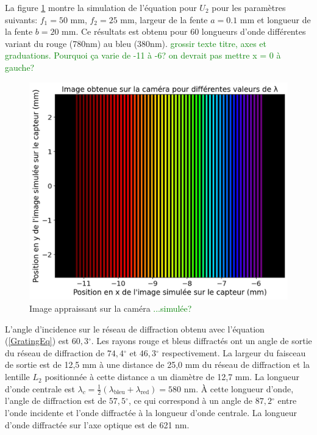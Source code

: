 \documentclass[conference]{IEEEtran}
\begin{document}
 La figure \ref{arc-en-ciel} montre la simulation de l'équation pour $U_2$ pour les paramètres suivants: 
 $f_1=50$ mm, $f_2=25$ mm, largeur de la fente $a=0.1$ mm et longueur de la fente $b=20$ mm. Ce résultats est obtenu pour
 60 longueurs d'onde différentes variant du rouge (780nm) au bleu (380nm). \textcolor{green}{grossir texte titre, axes et graduations. Pourquoi ça varie de -11 à -6? on devrait pas mettre x = 0 à gauche?}
 \begin{figure}[H]
    \centering
    \includegraphics[scale=0.4]{simu2.png}
    \caption{Image appraissant sur la caméra \textcolor{green}{...simulée?}}
    \label{arc-en-ciel}
\end{figure}

L'angle d'incidence sur le réseau de diffraction obtenu avec l'équation (\ref{GratingEq})
est $60,3{^\circ}$. Les rayons rouge et bleus diffractés ont un angle de sortie du réseau
de diffraction de $74,4{^\circ}$ et $46,3{^\circ}$ respectivement. La largeur du faisceau
de sortie est de 12,5 mm à une distance de 25,0 mm du réseau de diffraction et la lentille $L_2$
positionnée à cette distance a un diamètre de 12,7 mm. La longueur d'onde centrale est 
$\lambda_c=\frac{1}{2}(\lambda_{\text{bleu}}+\lambda_{\text{red}})=580$ nm. À cette longueur d'onde, l'angle de 
diffraction est de $57,5{^\circ}$, ce qui correspond à un angle de $87,2{^\circ}$ entre 
l'onde incidente et l'onde diffractée à la longueur d'onde centrale. 
La longueur d'onde diffractée sur l'axe optique est de 621 nm.
\end{document}
